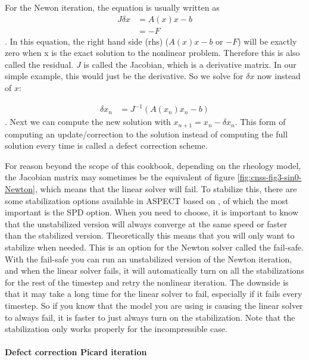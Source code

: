 For the Newon iteration, the equation is usually written as 
\begin{align}
    \label{sec:cnss:eq3:JdxAxx-b}
    J \delta x &= A(x) x - b \\
    &= -F
\end{align}. In this equation, the right hand side (rhs) ($A(x)x-b$ or $-F$) will be exactly 
zero when x is the exact solution to the nonlinear problem. Therefore this is also called the 
residual. $J$ is called the Jacobian, which is a derivative matrix. In our simple example, 
this would just be the derivative. So we solve for $\delta x$ now instead of $x$:

\begin{align}
    \delta x_n &= J^{-1}\left(A(x_n) x_n - b\right)
\end{align}. Next we can compute the new solution with $x_{n+1} = x_n - \delta x_n$. This 
form of computing an update/correction to the solution instead of computing the full
solution every time is called a defect correction scheme.

For reason beyond the scope of this cookbook, depending on the rheology model, the Jacobian 
matrix may sometimes be the equivalent of figure \ref{fig:cnss-fig3-sin0-Newton}, which 
means that the linear solver will fail. To stabilize this, there are some stabilization 
options available in ASPECT based on \cite{FBTGS19}, of which the most important is the 
SPD option. When you need to choose, it is important to know that the unstabilized version
will always converge at the same speed or faster than the stabilized version. Theoretically 
this means that you will only want to stabilize when needed. This is an option for the Newton
solver called the fail-safe. With the fail-safe you can run an unstabilized version of 
the Newton iteration, and when the linear solver fails, it will automatically turn on all
the stabilizations for the rest of the timestep and retry the nonlinear iteration. The downside
is that it may take a long time for the linear solver to fail, especially if it fails every
timestep. So if you know that the model you are using is causing the linear solver to always
fail, it is faster to just always turn on the stabilization.
Note that the stabilization only works properly for the incompressible case.


\paragraph{Defect correction Picard iteration}

